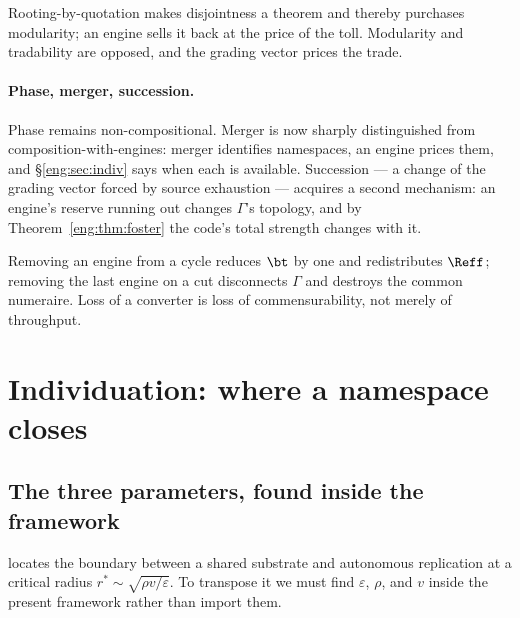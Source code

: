\begin{corollary}\label{eng:markets-sell-back-modularity}
Rooting-by-quotation makes disjointness a theorem and thereby purchases
modularity; an engine sells it back at the price of the toll. Modularity
and tradability are opposed, and the grading vector prices the trade.
\end{corollary}

\paragraph{Phase, merger, succession.} Phase remains non-compositional.
Merger is now sharply distinguished from composition-with-engines: merger
identifies namespaces, an engine prices them, and \S\ref{eng:sec:indiv} says
when each is available. Succession --- a change of the grading vector
forced by source exhaustion --- acquires a second mechanism: an engine's
reserve running out changes $\Gamma$'s topology, and by
Theorem~\ref{eng:thm:foster} the code's total strength changes with it.

\begin{corollary}\label{eng:extinction-degrades-price-system}
Removing an engine from a cycle reduces $\bt$ by one and redistributes
$\Reff$; removing the last engine on a cut disconnects $\Gamma$ and
destroys the common numeraire. Loss of a converter is loss of
commensurability, not merely of throughput.
\end{corollary}

\section{Individuation: where a namespace closes}\label{eng:S8}
\label{eng:sec:indiv}

\subsection{The three parameters, found inside the framework}\label{eng:S8.1}

\cite{compaut} locates the boundary between a shared substrate and
autonomous replication at a critical radius $r^\ast \sim
\sqrt{\rho v/\varepsilon}$. To transpose it we must find $\varepsilon$,
$\rho$, and $v$ inside the present framework rather than import them.


